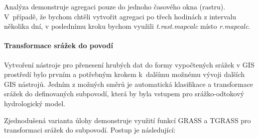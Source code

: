 \documentclass[a4paper,12pt,oneside]{report}
\begin{document}
Analýza demonstruje agregaci pouze do jednoho časového okna
(rastru). V~pří\-padě, že bychom chtěli vytvořit agregaci po třech
hodinách z intervalu několika dní, v poslednímu kroku bychom využili
\textit{t.rast.mapcalc} místo \textit{r.mapcalc}.


\paragraph*{Transformace srážek do povodí}
Vytvoření nástroje pro přenesení hrubých dat do formy vypočtených
srážek v GIS prostředí bylo prvním a potřebným krokem k~dalšímu
možnému vývoji dalších GIS nástrojů. Jedním z možných směrů je
automatická klasifikace a transformace srážek do definovaných
subpovodí, která by byla vstupem pro srážko-odtokový hydrologický
model.

Zjednodušená varianta úlohy demonstruje využití funkcí GRASS a TGRASS
pro transformaci srážek do subpovodí. Postup je následující:

\end{document}
